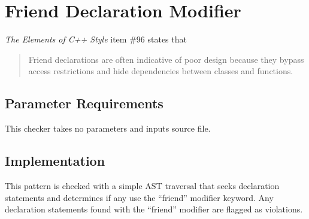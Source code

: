 %
%

\section{Friend Declaration Modifier}
\label{FriendDeclarationModifier::overview}

{\it The Elements of C++ Style} item \#96 states that
\begin{quote}
Friend declarations are often indicative of poor design because they bypass access restrictions and hide dependencies between classes and functions.
\end{quote}

\subsection{Parameter Requirements}
This checker takes no parameters and inputs source file.

\subsection{Implementation}
This pattern is checked with a simple AST traversal that seeks declaration statements and determines if any use the ``friend'' modifier keyword. Any declaration statements found with the ``friend'' modifier are flagged as violations.

